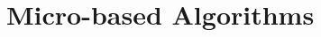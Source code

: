 \documentclass{sig-alternate}
\begin{document}


\section{Micro-based Algorithms} 
\label{sec:MicAl}




















\pagebreak



\end{document}
